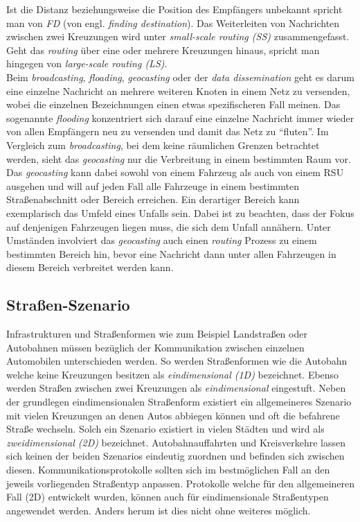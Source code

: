 \documentclass[english,runningheads,a4paper]{llncs}[2018/03/10]
\begin{document}
Ist die Distanz beziehungsweise die Position des Empfängers unbekannt spricht man von \textit{FD} (von engl. \textit{finding destination}).
Das Weiterleiten von Nachrichten zwischen zwei Kreuzungen wird unter \textit{small-scale routing (SS)} zusammengefasst.
Geht das \textit{routing} über eine oder mehrere Kreuzungen hinaus, spricht man hingegen von \textit{large-scale routing (LS)}\cite{conti2013mobile}.\\
Beim \textit{broadcasting}, \textit{floading}, \textit{geocasting} oder der \textit{data dissemination} geht es darum eine einzelne Nachricht an mehrere weiteren Knoten in einem Netz zu versenden, wobei die einzelnen Bezeichnungen einen etwas spezifischeren Fall meinen.
Das sogenannte \textit{flooding} konzentriert sich darauf eine einzelne Nachricht immer wieder von allen Empfängern neu zu versenden und damit das Netz zu ``fluten''.
Im Vergleich zum \textit{broadcasting}, bei dem keine räumlichen Grenzen betrachtet werden, sieht das \textit{geocasting} nur die Verbreitung in einem bestimmten Raum vor.
Das \textit{geocasting} kann dabei sowohl von einem Fahrzeug als auch von einem RSU ausgehen und will auf jeden Fall alle Fahrzeuge in einem bestimmten Straßenabschnitt oder Bereich erreichen.
Ein derartiger Bereich kann exemplarisch das Umfeld eines Unfalls sein.
Dabei ist zu beachten, dass der Fokus auf denjenigen Fahrzeugen liegen muss, die sich dem Unfall annähern.
Unter Umständen involviert das \textit{geocasting} auch einen \textit{routing} Prozess zu einem bestimmten Bereich hin, bevor eine Nachricht dann unter allen Fahrzeugen in diesem Bereich verbreitet werden kann\cite{conti2013mobile}.

\subsection{Straßen-Szenario}\label{subsec:strassen-szenario}
Infrastrukturen und Straßenformen wie zum Beispiel Landstraßen oder Autobahnen müssen bezüglich der Kommunikation zwischen einzelnen Automobilen unterschieden werden.
So werden Straßenformen wie die Autobahn welche keine Kreuzungen besitzen als \textit{eindimensional (1D)} bezeichnet.
Ebenso werden Straßen zwischen zwei Kreuzungen als \textit{eindimensional} eingestuft.
Neben der grundlegen eindimensionalen Straßenform existiert ein allgemeineres Szenario mit vielen Kreuzungen an denen Autos abbiegen können und oft die befahrene Straße wechseln.
Solch ein Szenario existiert in vielen Städten und wird als \textit{zweidimensional (2D)} bezeichnet.
Autobahnauffahrten und Kreisverkehre lassen sich keinen der beiden Szenarios eindeutig zuordnen und befinden sich zwischen diesen.
Kommunikationsprotokolle sollten sich im bestmöglichen Fall an den jeweils vorliegenden Straßentyp anpassen.
Protokolle welche für den allgemeineren Fall (2D) entwickelt wurden, können auch für eindimensionale Straßentypen angewendet werden.
Anders herum ist dies nicht ohne weiteres möglich\cite{conti2013mobile}.
\end{document}
